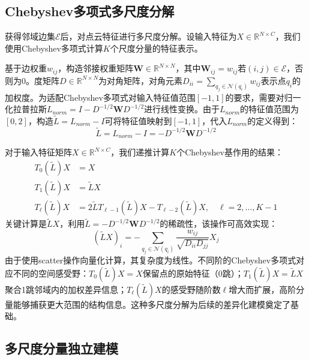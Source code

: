 \documentclass[12pt,a4paper,openany,oneside]{ctexbook}
\theoremstyle{definition}
\theoremstyle{remark}
\begin{document}
\subsection{Chebyshev多项式多尺度分解}

获得邻域边集$\mathcal{E}$后，对点云特征进行多尺度分解。设输入特征为$X \in \mathbb{R}^{N \times C}$，我们使用Chebyshev多项式计算$K$个尺度分量的特征表示。

基于边权重$w_{ij}$，构造邻接权重矩阵$\mathbf{W} \in \mathbb{R}^{N \times N}$，其中$\mathbf{W}_{ij} = w_{ij}$若$(i,j) \in \mathcal{E}$，否则为0。度矩阵$D \in \mathbb{R}^{N \times N}$为对角矩阵，对角元素$D_{ii} = \sum_{q_j \in \mathcal{N}(q_i)} w_{ij}$表示点$q_i$的加权度。为适配Chebyshev多项式对输入特征值范围$[-1, 1]$的要求，需要对归一化拉普拉斯$L_{norm} = I - D^{-1/2}\mathbf{W}D^{-1/2}$进行线性变换。由于$L_{norm}$的特征值范围为$[0, 2]$，构造$\tilde{L} = L_{norm} - I$可将特征值映射到$[-1, 1]$，代入$L_{norm}$的定义得到：
\begin{equation}
\tilde{L} = L_{norm} - I = -D^{-1/2}\mathbf{W}D^{-1/2}
\end{equation}

对于输入特征矩阵$X \in \mathbb{R}^{N \times C}$，我们递推计算$K$个Chebyshev基作用的结果：
\begin{equation}
\begin{aligned}
T_0(\tilde{L})X &= X \\
T_1(\tilde{L})X &= \tilde{L}X \\
T_\ell(\tilde{L})X &= 2\tilde{L}T_{\ell-1}(\tilde{L})X - T_{\ell-2}(\tilde{L})X, \quad \ell = 2, \ldots, K-1
\end{aligned}
\end{equation}
关键计算是$\tilde{L}X$，利用$\tilde{L} = -D^{-1/2}\mathbf{W}D^{-1/2}$的稀疏性，该操作可高效实现：
\begin{equation}
(\tilde{L}X)_i = -\sum_{q_j \in \mathcal{N}(q_i)} \frac{w_{ij}}{\sqrt{D_{ii}D_{jj}}} X_j
\end{equation}
由于使用scatter操作向量化计算，其复杂度为线性。不同阶的Chebyshev多项式对应不同的空间感受野：$T_0(\tilde{L})X = X$保留点的原始特征（0跳）；$T_1(\tilde{L})X = \tilde{L}X$聚合1跳邻域内的加权差异信息；$T_\ell(\tilde{L})X$的感受野随阶数$\ell$增大而扩展，高阶分量能够捕获更大范围的结构信息。这种多尺度分解为后续的差异化建模奠定了基础。

\subsection{多尺度分量独立建模}
\end{document}
